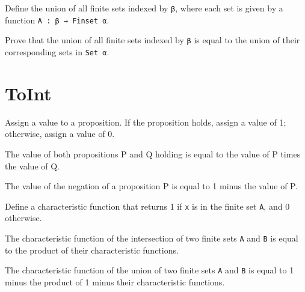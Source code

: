 \begin{definition}\label{FinUnion₀}
  Define the union of all finite sets indexed by \verb|β|, where each set is given by a function \verb|A : β → Finset α|.
\end{definition}

\begin{lemma}\label{eq_FinUnion₀}
  Prove that the union of all finite sets indexed by \verb|β| is equal to the union of their corresponding sets in \verb|Set α|.
\end{lemma}

\section{ToInt}

\begin{definition}\label{toInt}
  \leanok
  Assign a value to a proposition. If the proposition holds, assign a value of 1; otherwise, assign a value of 0.
\end{definition}

\begin{lemma}\label{toInt_and}
  \leanok
  The value of both propositions P and Q holding is equal to the value of P times the value of Q.
\end{lemma}

\begin{lemma}\label{toInt_not}
  \leanok
  The value of the negation of a proposition P is equal to 1 minus the value of P.
\end{lemma}

\begin{definition}\label{char_fun}
  \leanok
  Define a characteristic function that returns 1 if \verb|x| is in the finite set \verb|A|, and 0 otherwise.
\end{definition}

\begin{lemma}\label{char_fun_inter}
  The characteristic function of the intersection of two finite sets \verb|A| and \verb|B| is equal to the product of their characteristic functions.
\end{lemma}

\begin{lemma}\label{char_fun_union}
  The characteristic function of the union of two finite sets \verb|A| and \verb|B| is equal to 1 minus the product of 1 minus their characteristic functions.
\end{lemma}
